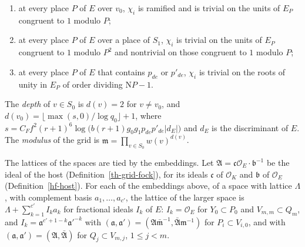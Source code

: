 \begin{definition}
\begin{enumerate}
  no place of $S_0$;
\item[(d)] at every place $P$ of $E$ over $v_0$, $\chi_i$ is ramified and is
  trivial on the units of $E_P$ congruent to $1$ modulo $P$;
\item[(e)] at every place $P$ of $E$ over a place of $S_1$, $\chi_i$ is trivial
  on the units of $E_P$ congruent to $1$ modulo $P^2$ and nontrivial on those
  congruent to $1$ modulo $P$;
\item[(f)] at every place $P$ of $E$ that contains $p_{de}$ or $p'_{de}$,
  $\chi_i$ is trivial on the roots of unity in $E_P$ of order dividing
  $\mathrm NP-1$.
\end{enumerate}
The \emph{depth} of $v\in S_0$ is $d(v)=2$ for $v\neq v_0$, and
$d(v_0)=\lfloor\max(s,0)/\log q_0\rfloor+1$, where
$s=C_Ff^2(r+1)^6\log\bigl(b(r+1)g_0g_1p_{de}p'_{de}|d_E|\bigr)$ and $d_E$ is
the discriminant of $E$. The \emph{modulus} of the grid is
$\mathfrak m=\prod_{v\in S_0}w(v)^{d(v)}$.

The lattices of the spaces are tied by the embeddings. Let
$\mathfrak A=\mathfrak c\mathcal O_E\cdot\mathfrak b^{-1}$ be the ideal of the
host (Definition~\ref{th-grid-fock}), for its ideals $\mathfrak c$ of
$\mathcal O_K$ and $\mathfrak b$ of $\mathcal O_E$ (Definition~\ref{hf-host}).
For each of the embeddings above,
of a space with lattice $\Lambda$, with complement basis $a_1,\ldots,a_{c'}$,
the lattice of the larger space is $\Lambda+\sum_{k=1}^{c'}I_ka_k$ for
fractional ideals $I_k$ of $E$: $I_k=\mathcal O_E$ for $Y_0\subset P_0$ and
$V_{m,m}\subset Q_m$, and $I_k=\mathfrak a^{c'+1-k}\mathfrak a'^{-k}$
with
$(\mathfrak a,\mathfrak a')=(\mathfrak A\bar{\mathfrak m}^{-1},\bar{\mathfrak A}\mathfrak m^{-1})$
for $P_i\subset V_{i,0}$, and with
$(\mathfrak a,\mathfrak a')=(\mathfrak A,\bar{\mathfrak A})$ for
$Q_j\subset V_{m,j}$, $1\leq j<m$.


\end{definition}
